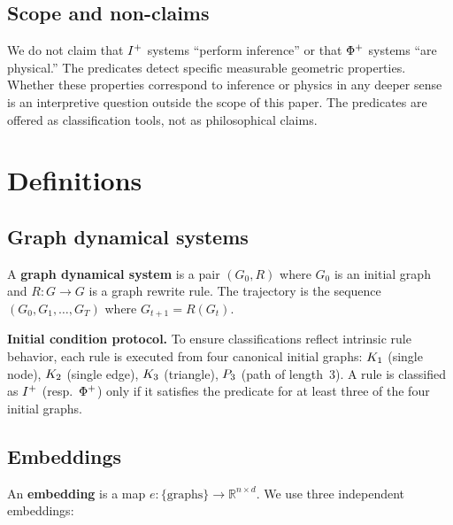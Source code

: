 \documentclass{../shared/primo}
\begin{document}
\subsection{Scope and non-claims}

We do not claim that $I\textsuperscript{+}$ systems ``perform inference'' or that $\Phi\textsuperscript{+}$ systems ``are physical.'' The predicates detect specific measurable geometric properties. Whether these properties correspond to inference or physics in any deeper sense is an interpretive question outside the scope of this paper. The predicates are offered as classification tools, not as philosophical claims.


\section{Definitions}
\label{sec:defs}

\subsection{Graph dynamical systems}

A \textbf{graph dynamical system} is a pair $(G_0, R)$ where $G_0$ is an initial graph and $R: G \to G$ is a graph rewrite rule. The trajectory is the sequence $(G_0, G_1, \ldots, G_T)$ where $G_{t+1} = R(G_t)$.

\textbf{Initial condition protocol.} To ensure classifications reflect intrinsic rule behavior, each rule is executed from four canonical initial graphs: $K_{1}$ (single node), $K_{2}$ (single edge), $K_{3}$ (triangle), $P_{3}$ (path of length~3). A rule is classified as $I\textsuperscript{+}$ (resp.\ $\Phi\textsuperscript{+}$) only if it satisfies the predicate for at least three of the four initial graphs.

\subsection{Embeddings}

An \textbf{embedding} is a map $e: \{\text{graphs}\} \to \mathbb{R}^{n \times d}$. We use three independent embeddings:
\end{document}
